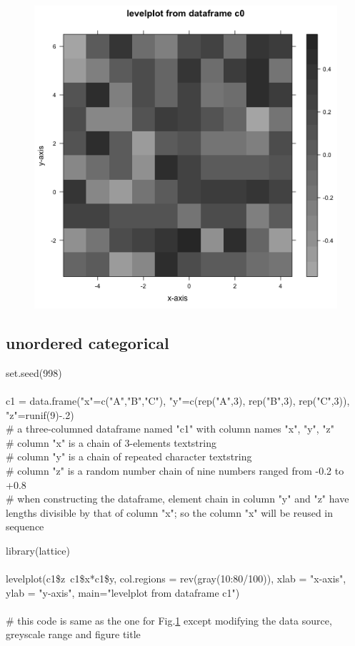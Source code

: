 \documentclass[../note.tex]{subfiles} %
\begin{document}
\begin{figure}[H]
    \centering
    \includegraphics[width=.5\linewidth]{graph/lvPlt1.png}
    \label{g:lv1}
\end{figure}

\subsection{unordered categorical}
\begin{code}
set.seed(998)\\\\
c1 = data.frame("x"=c("A","B","C"), "y"=c(rep("A",3), rep("B",3), rep("C",3)), "z"=runif(9)-.2)\\
\# a three-columned dataframe named "c1" with column names "x", "y", "z"\\
\# column "x" is a chain of 3-elements textstring\\
\# column "y" is a chain of repeated character textstring\\
\# column "z" is a random number chain of nine numbers ranged from -0.2 to +0.8\\
\# when constructing the dataframe, element chain in column "y" and "z" have lengths divisible by that of column "x"; so the column "x" will be reused in sequence
\end{code}

\begin{code}
library(lattice)\\\\
levelplot(c1\$z~c1\$x*c1\$y, col.regions = rev(gray(10:80/100)), xlab = "x-axis", ylab = "y-axis", main="levelplot from dataframe c1")\\\\
\# this code is same as the one for Fig.\ref{g:lv1} except modifying the data source, greyscale range and figure title
\end{code}
\end{document}
